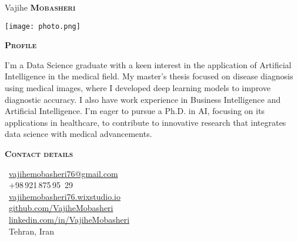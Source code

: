 \documentclass[11pt, a4paper]{article}
\newcommand{\headleft}[1]{\vspace*{3ex}\textsc{\textbf{#1}}\par%
    \vspace*{-1.5ex}\hrulefill\par\vspace*{0.7ex}}
\begin{document}
\setlength{\topskip}{0pt}
\setlength{\parindent}{0pt}
\setlength{\parskip}{0pt}
\setlength{\fboxsep}{0pt}
\pagestyle{empty}
\raggedbottom

\begin{minipage}[t]{0.33\textwidth} %
\colorbox{pink}{\begin{minipage}[t][5mm][t]{\textwidth}\null\hfill\null\end{minipage}}

\vspace{-.2ex} %
\colorbox{pink!60}{\color{black}  %
\textwidth\relax%
\begin{minipage}[t][293mm][t]{0.82\textwidth}
\raggedright
\vspace*{2.5ex}

\Large Vajihe \textbf{\textsc{Mobasheri}} \normalsize 

\null\hfill\texttt{[image: photo.png]}\hfill\null

\vspace*{0.5ex} %

\headleft{Profile}
I'm a Data Science graduate with a keen interest in the application of Artificial Intelligence in the medical field. My master's thesis focused on disease diagnosis using medical images, where I developed deep learning models to improve diagnostic accuracy. I also have work experience in Business Intelligence and Artificial Intelligence. I'm eager to pursue a Ph.D. in AI, focusing on its applications in healthcare, to contribute to innovative research that integrates data science with medical advancements.


\headleft{Contact details}
\small %
\faEnvelopeO\  \href{mailto:vajihemobasheri76@gmail.com}{vajihemobasheri76@gmail.com} \\[0.1ex]
\faPhone\ +98\,921\,875\,95\, 29 \\[0.5ex]
\faGlobe\ \href{https://vajihemobasheri76.wixstudio.io/mycv}{vajihemobasheri76.wixstudio.io} \\[0.1ex]
\faGithub\ \href{https://github.com/VajiheMobasheri}{github.com/VajiheMobasheri} \\[0.1ex]
\faLinkedinSquare\ \href{https://www.linkedin.com/in/vajihe-mobasheri-a2b796231}{linkedin.com/in/VajiheMobasheri} \\[0.1ex]
\faLocationArrow\ Tehran, Iran
\normalsize


\end{minipage}}
\end{minipage}
\end{document}

